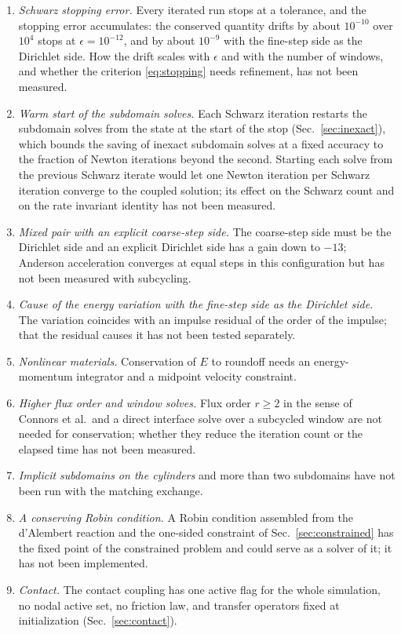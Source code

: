 \documentclass[11pt]{article}
\begin{document}
\begin{enumerate}[label=(\roman*),itemsep=2pt]
\item \emph{Schwarz stopping error.} Every iterated run stops at a
  tolerance, and the stopping error accumulates: the conserved quantity
  drifts by about $10^{-10}$ over $10^4$ stops at $\epsilon = 10^{-12}$, and
  by about $10^{-9}$ with the fine-step side as the Dirichlet side. How the
  drift scales with $\epsilon$ and with the number of windows, and whether
  the criterion \eqref{eq:stopping} needs refinement, has not been
  measured.
\item \emph{Warm start of the subdomain solves.} Each Schwarz iteration
  restarts the subdomain solves from the state at the start of the stop
  (Sec.~\ref{sec:inexact}), which bounds the saving of inexact
  subdomain solves at a fixed accuracy to the fraction of Newton
  iterations beyond the second. Starting each solve from the previous
  Schwarz iterate would let one Newton iteration per Schwarz iteration
  converge to the coupled solution; its effect on the Schwarz count and on
  the rate invariant identity has not been measured.
\item \emph{Mixed pair with an explicit coarse-step side.} The coarse-step
  side must be the Dirichlet side and an explicit Dirichlet side has a gain
  down to $-13$; Anderson acceleration converges at equal steps in this
  configuration but has not been measured with subcycling.
\item \emph{Cause of the energy variation with the fine-step side as the
  Dirichlet side.} The variation coincides with an impulse residual of the
  order of the impulse; that the residual causes it has not been tested
  separately.
\item \emph{Nonlinear materials.} Conservation of $E$ to roundoff needs an
  energy-momentum integrator and a midpoint velocity constraint.
\item \emph{Higher flux order and window solves.} Flux order $r \ge 2$ in
  the sense of Connors et al.\ and a direct interface solve over a
  subcycled window are not needed for conservation; whether they reduce
  the iteration count or the elapsed time has not been measured.
\item \emph{Implicit subdomains on the cylinders} and more than two
  subdomains have not been run with the matching exchange.
\item \emph{A conserving Robin condition.} A Robin condition assembled from
  the d'Alembert reaction and the one-sided constraint of
  Sec.~\ref{sec:constrained} has the fixed point of the constrained problem
  and could serve as a solver of it; it has not been implemented.
\item \emph{Contact.} The contact coupling has one active flag for the
  whole simulation, no nodal active set, no friction law, and transfer
  operators fixed at initialization (Sec.~\ref{sec:contact}).
\end{enumerate}
\end{document}
